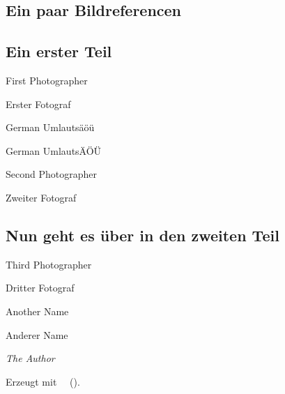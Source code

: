 \documentclass{berg}
\begin{document}
\large
\begin{multicols}{2}
\normalbaselines\linespread{1.1}\selectfont
\def\contentsname{\Large Inhalt\large\dotfill Nr/Jahr}\tableofcontents
\clearpage

\normalsize
\normalbaselines\linespread{0.6}\selectfont




\normalsize
\normalbaselines\linespread{0.6}\selectfont
\BergPrintPictureCredits


\normalbaselines\linespread{0.88}\selectfont
\section{Ein paar Bildreferencen}

\subsection{Ein erster Teil}

First Photographer
%

\lipsum[1]

Erster Fotograf
%

\lipsum[2]

German Umlautsäöü
%

\lipsum[3]

German UmlautsÄÖÜ
%

\lipsum[4]

Second Photographer
%

\lipsum[5]

Zweiter Fotograf
%

\lipsum[6]

\subsection{Nun geht es über in den zweiten Teil}

\lipsum[6]

Third Photographer
%

\lipsum[7]

Dritter Fotograf
%

\lipsum[8]

Another Name
%

\lipsum[9]

Anderer Name
%

\lipsum[10]



\textit{\normalsize The Author}
\bigskip



{\normalsize
Erzeugt mit \Berg\ \BergMajorVersion\ (\BergUrl).}

\end{multicols}

\BergAddPictureCreditsTocEntry
\end{document}
